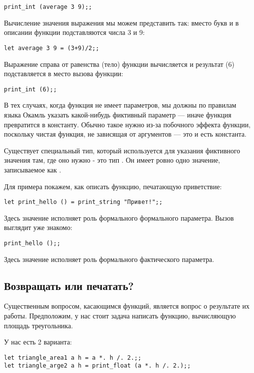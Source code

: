 \begin{verbatim}
print_int (average 3 9);;
\end{verbatim}

Вычисление значения выражения мы можем представить так: вместо букв  и 
в описании функции подставляются числа 3 и 9:

\begin{verbatim}
let average 3 9 = (3+9)/2;;
\end{verbatim}
 
Выражение справа от равенства (тело) функции вычисляется и результат (6)
подставляется в место вызова функции:

\begin{verbatim}
print_int (6);;
\end{verbatim}

В тех случаях, когда функция не имеет параметров, мы должны по правилам
языка Окамль указать какой-нибудь фиктивный параметр --- иначе функция
превратится в константу. Обычно такое нужно из-за побочного эффекта
функции, поскольку чистая функция, не зависящая от аргументов --- это
и есть константа.

Существует специальный тип, который используется для указания
фиктивного значения там, где оно нужно - это тип . Он имеет ровно 
одно значение, записываемое как \s{()}.

Для примера покажем, как описать функцию, печатающую приветствие:

\begin{verbatim}
let print_hello () = print_string "Привет!";;
\end{verbatim}

Здесь значение \s{()} исполняет роль формального формального параметра.
Вызов выглядит уже знакомо:

\begin{verbatim}
print_hello ();;
\end{verbatim}

Здесь значение \s{()} исполняет роль формального фактического параметра.

\subsection{Возвращать или печатать?}

Существенным вопросом, касающимся функций, является вопрос о результате
их работы. Предположим, у нас стоит задача написать функцию, вычисляющую
площадь треугольника.

У нас есть 2 варианта:
\begin{verbatim}
let triangle_area1 a h = a *. h /. 2.;;
let triangle_arge2 a h = print_float (a *. h /. 2.);;
\end{verbatim}

